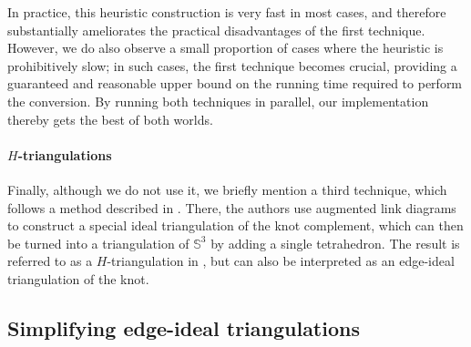 \documentclass[10pt,a4paper]{amsart}
\begin{document}
In practice, this heuristic construction is very fast in most cases, and therefore substantially ameliorates the practical disadvantages of the first technique.
However, we do also observe a small proportion of cases where the heuristic is prohibitively slow;
in such cases, the first technique becomes crucial, providing a guaranteed and reasonable upper bound on the running time required to perform the conversion.
By running both techniques in parallel, our implementation thereby gets the best of both worlds.

\paragraph*{$H$-triangulations}

Finally, although we do not use it, we briefly mention a third technique, which follows a method described in  \cite{ibarra2024Htriangulation}.
There, the authors use augmented link diagrams to construct a special ideal triangulation of the knot complement,
which can then be turned into a triangulation of $\mathbb{S}^3$ by adding a single tetrahedron.
The result is referred to as a $H$-triangulation in \cite{aribi2023Htriangulation,ibarra2024Htriangulation},
but can also be interpreted as an edge-ideal triangulation of the knot.

\subsection{Simplifying edge-ideal triangulations}\label{app:ssec:simplifyEdgeIdeal}
\end{document}
